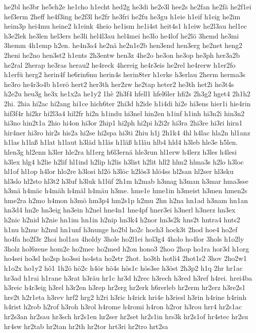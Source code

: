 {he2bl
he3br
he5ch2e
he1cho
h1echt
hed2g
he3di
he2e3l
hee2s
he2fan
he2fä
he2f1ei
hef3erm
2heff
he4f3ing
he2f3l
he2fr
he3fri
he2fu
he3gu
h1eie
h1eif
h1eig
he2im
heim3p
hei4mu
heine2
h1eink
4heio
he1ism
he1i4st
heit4s1
h1eiw
he2l3au
hel1ec
h3e2lek
he3len
hel3ers
he3li
hel4l3au
hel4mei
he3lo
he4lof
he2lö
3hemd
he3mi
3hemm
4h1emp
h2en.
he4n3a4
he2nä
he2n1e2b
hen3end
hen3erg
he2net
heng2
2heni
he2no
hen3st2
h1ents
2h3entw
hen3z
4he2o
he3on
he3op
he3ph
her3a2b
he2ral
2herap
he3ras
herau2
he4reck
4hereig
he4r3eis
he2rel
he4rerw
h1er2fo
h1erfü
herg2
herin4f
he6rin6nu
herin4s
herin8ter
h1erke
h3erlau
2herm
herma3s
he3ro
he4r3o4b
h1erö
hert2
her3th
her2zw
he2tap
heter2
he3th
het2i
he3t4s
h2e2u
heu3g
he3x
he1x2a
he1y2
1hè
2h3f4
hfell1
hfel6ler
hfi2s
2h3g2
hget4
2h1h2
2hi.
2hia
hi2ac
hi2ang
hi1ce
hich6ter
2hi3d
h2ide
h1i4di
hi2e
hi3ens
hier1i
hie4rin
hif3f4r
hi2kr
hi2l3a4
hil2fr
hi2n
h1indu
hi3nel
hin2en
h1inf
h1inh
hi3n2i
hin3n2
hi3no
hin2t1a
2hio
hi4on
hi3or
2hip1
hi2ph
hi2pi
h2i2r
hi3ra
2hi3re
hi3ri
hirn1
hir4ner
hi3ro
hir2s
his2a
hi2se
hi2spa
hi3ti
2hiu
h1j
2h1k4
4hl
h4lac
hla2n
hl1anz
h1las
h1laß
h1lat
h1laut
h3läd
h1läs
h1läß
h1läu
hlb4
hld4
h3leb
hle3e
h5len.
hlen3g
hl2enn
h3ler
hle2ra
hl1erg
h6l3ernä
hle3run
hl1erw
h4lerz
h3les
h4lesi
h3lex
hlg4
h2lie
h2lif
hl1ind
h2lip
h2lis
h3list
h2lit
hll2
hlm2
hlma3s
h2lo
h3loc
hl1of
hl1op
h4lor
hlo2re
h3losi
hl2ö
h3löc
h2lös3
hlö4ss
hl2san
hl2ser
hl3sku
hl3slo
hl2sto
hl3t2
h3luf
h3luk
h1lüf
2h1m
h2mab
h3mag
h3man
h3mar
hma3sse
h3mä
h4mäc
h4mäh
h4mäl
h4mäu
h3me.
hme1e
hme1in
h3meist
h3men
hmen2s
hme2ra
h2mo
h4mon
h3mö
hm3p4
hm2s1p
h2mu
2hn
h2na
hn1ad
h3nam
hn1an
hn3d4
hn2e
hn3eig
hn3ein
h2nel
hne4n1
hne4pf
hner3ei
h3nerl
h3nerz
hn3ex
h2nic
h2nid
h2nie
hn1im
hn1in
h2nip
hn3k4
h2nor
hn3s2k
hns2t
hntra4
hnts2
h1nu
h2nuc
h2nul
hn1unf
h3nunge
ho2bl
ho2c
hoch3
hock3t
2hod
hoe4
ho2ef
ho4fa
ho2f3r
2hoi
hol1au
4holdy
3hole
ho2l1ei
hol3g4
4holo
ho4lor
3hols
h1o2ly
3holz
hol6zene
hom2e
ho2mec
ho2med
h2on
hono3
2hoo
2hop
ho1ra
hor3d
h1org
ho4sei
ho3sl
ho2sp
ho3ssi
ho4sta
ho2str
2hot.
ho3th
hotli4
2hot1s2
3hov
2ho2w1
h1o2x
ho1y2
hô1
1h2ö
hö2c
h4ör
hö4s
hös1c
hös3se
h3öst
2h3p2
h1q
2hr
hr1ac
hr3ad
h1rai
h1rane
h3rat
h3räu
hr1c
hr3d
h2rec
h3rech
h3red
h3ref
h4rei.
hrei4ba
h3reic
h4r3eig
h3rel
h3r2en
h3rep
hr2erg
hr2erk
h6rerleb
hr2erm
hr2erz
h3re2s1
hre2t
h2r1eta
h3rev
hrf2
hrg2
h2ri
h3ric
h4rick
hri4e
h3riesl
h3rin
h4rine
h4rinh
h4rist
h2rob
h2rof
h3roh
h3rol
h4rome
h4romi
h4ron
h2ror
h3rou
hrr4
hr2s1ac
hr2s3an
hr2sau
hr3sch
hr2s1en
hr2ser
hr2set
hr2s1in
hrs3k
hr2s1of
hr4stec
hr2su
hr4sw
hr2tab
hr2tan
hr2th
hr2tor
hrt3ri
hr2tro
hrt2sa
}
